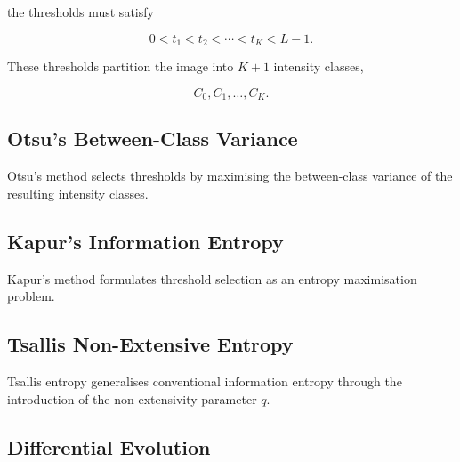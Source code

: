 \documentclass[review]{elsarticle}
\begin{document}
the thresholds must satisfy

\begin{equation}
0 < t_1 < t_2 < \cdots < t_K < L-1.
\end{equation}

These thresholds partition the image into $K+1$ intensity classes,

\begin{equation}
C_0,C_1,\ldots,C_K.
\end{equation}


\subsection{Otsu's Between-Class Variance}
\label{sec:otsu}

%

Otsu's method selects thresholds by maximising the between-class
variance of the resulting intensity classes.



\subsection{Kapur's Information Entropy}
\label{sec:kapur}

Kapur's method formulates threshold selection as an entropy maximisation
problem.



\subsection{Tsallis Non-Extensive Entropy}
\label{sec:tsallis}

Tsallis entropy generalises conventional information entropy through
the introduction of the non-extensivity parameter $q$.

%


\subsection{Differential Evolution}
\label{sec:de_background}
\end{document}
